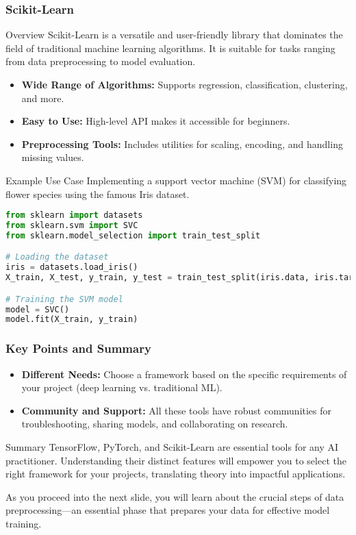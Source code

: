 \documentclass{beamer}
\begin{document}
\begin{frame}[fragile]
    \frametitle{Scikit-Learn}
    \begin{block}{Overview}
        Scikit-Learn is a versatile and user-friendly library that dominates the field of traditional machine learning algorithms. It is suitable for tasks ranging from data preprocessing to model evaluation.
    \end{block}
    
    \begin{itemize}
        \item \textbf{Wide Range of Algorithms:} Supports regression, classification, clustering, and more.
        \item \textbf{Easy to Use:} High-level API makes it accessible for beginners.
        \item \textbf{Preprocessing Tools:} Includes utilities for scaling, encoding, and handling missing values.
    \end{itemize}

    \begin{block}{Example Use Case}
        Implementing a support vector machine (SVM) for classifying flower species using the famous Iris dataset.
    \end{block}

    \begin{lstlisting}[language=Python]
from sklearn import datasets
from sklearn.svm import SVC
from sklearn.model_selection import train_test_split

# Loading the dataset
iris = datasets.load_iris()
X_train, X_test, y_train, y_test = train_test_split(iris.data, iris.target, test_size=0.2)

# Training the SVM model
model = SVC()
model.fit(X_train, y_train)
    \end{lstlisting}
\end{frame}

\begin{frame}
    \frametitle{Key Points and Summary}
    \begin{itemize}
        \item \textbf{Different Needs:} Choose a framework based on the specific requirements of your project (deep learning vs. traditional ML).
        \item \textbf{Community and Support:} All these tools have robust communities for troubleshooting, sharing models, and collaborating on research.
    \end{itemize}
    
    \begin{block}{Summary}
        TensorFlow, PyTorch, and Scikit-Learn are essential tools for any AI practitioner. Understanding their distinct features will empower you to select the right framework for your projects, translating theory into impactful applications.
    \end{block}
    
    As you proceed into the next slide, you will learn about the crucial steps of data preprocessing—an essential phase that prepares your data for effective model training.
\end{frame}
\end{document}
